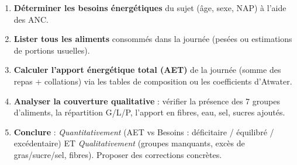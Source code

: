 \documentclass[11pt]{article}
\begin{document}
\begin{methode}
\begin{enumerate}
\item \textbf{Déterminer les besoins énergétiques} du sujet (âge, sexe, NAP) à l'aide des ANC.
\item \textbf{Lister tous les aliments} consommés dans la journée (pesées ou estimations de portions usuelles).
\item \textbf{Calculer l'apport énergétique total (AET)} de la journée (somme des repas + collations) via les tables de composition ou les coefficients d'Atwater.
\item \textbf{Analyser la couverture qualitative} : vérifier la présence des 7 groupes d'aliments, la répartition G/L/P, l'apport en fibres, eau, sel, sucres ajoutés.
\item \textbf{Conclure} : \emph{Quantitativement} (AET vs Besoins : déficitaire / équilibré / excédentaire) ET \emph{Qualitativement} (groupes manquants, excès de gras/sucre/sel, fibres). Proposer des corrections concrètes.
\end{enumerate}
\end{methode}
\end{document}
